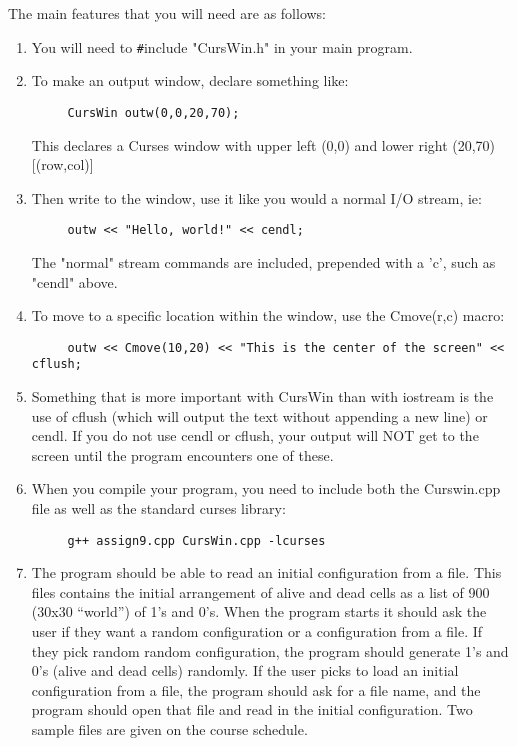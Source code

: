 \documentclass[11pt]{article}
\begin{document}
The main features that you will need are as follows: 

\small
\begin{enumerate}
  \item You will need to {\texttt \#include "CursWin.h"} in your main program.
  \item  To make an output window, declare something like:
    \begin{verbatim}
     CursWin outw(0,0,20,70);
    \end{verbatim}
    This declares a Curses window with upper left (0,0) and lower right 
    (20,70) [(row,col)]
  \item Then write to the window, use it like you would a normal I/O stream, 
     ie:
    \begin{verbatim}
     outw << "Hello, world!" << cendl;
    \end{verbatim}
      The "normal" stream commands are included, prepended with a 'c', such 
      as "cendl" above.
   \item To move to a specific location within the window, use the Cmove(r,c) 
       macro:
    \begin{verbatim}
     outw << Cmove(10,20) << "This is the center of the screen" << cflush;
    \end{verbatim} 
   \item Something that is more important with CursWin than with iostream is 
         the use of cflush (which will output the text without
         appending a new line) or cendl. If you do not use cendl or cflush, 
         your 
         output will NOT get to the screen until the program encounters one 
         of these.  
   \item When you compile your program, you need to include both the Curswin.cpp
         file as well as the standard curses library:
    \begin{verbatim}
     g++ assign9.cpp CursWin.cpp -lcurses
    \end{verbatim}

\item The program should be able to read an initial configuration from a file.  This files contains the initial arrangement of alive and dead cells as a list of 900 (30x30 ``world'') of 1's and 0's.  When the program starts it should ask the user
if they want a random configuration or a configuration from a file.  If they pick random random configuration, the program should generate 1's and 0's (alive and dead cells) randomly.  If the user picks to load an initial configuration from a file, the program should ask for a file name, and the program should open that file and read in the initial configuration.  Two sample files are given on the course schedule.
\end{enumerate}
\end{document}
